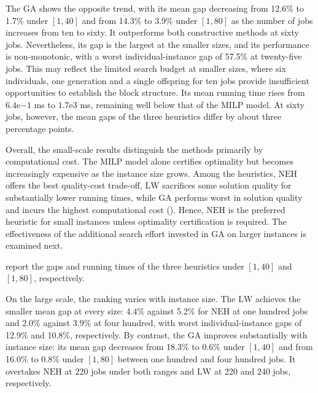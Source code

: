 ﻿\documentclass[12pt]{article} \textheight=24.5cm \textwidth=16.5cm \parskip = 0.165cm
\begin{document}
\begin{sloppypar}
        The $\mathrm{GA}$ shows the opposite trend, with its mean gap decreasing from 12.6\% to 1.7\% under $[1,40]$ and from 14.3\% to 3.9\% under $[1,80]$ as the number of jobs increases from ten to sixty.
        It outperforms both constructive methods at sixty jobs.
        Nevertheless, its gap is the largest at the smaller sizes, and its performance is non-monotonic, with a worst individual-instance gap of 57.5\% at twenty-five jobs.
        This may reflect the limited search budget at smaller sizes, where six individuals, one generation and a single offspring for ten jobs provide insufficient opportunities to establish the block structure.
        Its mean running time rises from $6.4\mathrm{e}{-1}$ ms to $1.7\mathrm{e}3$ ms, remaining well below that of the $\mathrm{MILP}$ model.
        At sixty jobs, however, the mean gaps of the three heuristics differ by about three percentage points.

        Overall, the small-scale results distinguish the methods primarily by computational cost.
        The $\mathrm{MILP}$ model alone certifies optimality but becomes increasingly expensive as the instance size grows.
        Among the heuristics, $\mathrm{NEH}$ offers the best quality-cost trade-off, $\mathrm{LW}$ sacrifices some solution quality for substantially lower running times, while $\mathrm{GA}$ performs worst in solution quality and incurs the highest computational cost ().
        Hence, $\mathrm{NEH}$ is the preferred heuristic for small instances unless optimality certification is required.
        The effectiveness of the additional search effort invested in $\mathrm{GA}$ on larger instances is examined next.

         report the gaps and running times of the three heuristics under $[1,40]$ and $[1,80]$, respectively.

        On the large scale, the ranking varies with instance size.
        The $\mathrm{LW}$ achieves the smaller mean gap at every size: 4.4\% against 5.2\% for $\mathrm{NEH}$ at one hundred jobs and 2.0\% against 3.9\% at four hundred, with worst individual-instance gaps of 12.9\% and 10.8\%, respectively.
        By contrast, the $\mathrm{GA}$ improves substantially with instance size: its mean gap decreases from 18.3\% to 0.6\% under $[1,40]$ and from 16.0\% to 0.8\% under $[1,80]$ between one hundred and four hundred jobs.
        It overtakes $\mathrm{NEH}$ at 220 jobs under both ranges and $\mathrm{LW}$ at 220 and 240 jobs, respectively.


\end{sloppypar}
\end{document}
